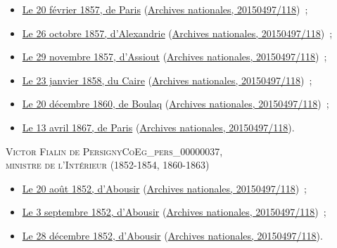 \documentclass{book}
\begin{document}
{\begin{itemize}
\item \hyperlink{CoEg_Mariette_1857-02-20}{Le 20 février 1857, de Paris} (\hyperlink{CoEg_Mariette_ms_001}{Archives nationales, 20150497/118})~;
\item \hyperlink{CoEg_Mariette_1857-10-26}{Le 26 octobre 1857, d’Alexandrie} (\hyperlink{CoEg_Mariette_ms_001}{Archives nationales, 20150497/118})~;
\item \hyperlink{CoEg_Mariette_1857-11-29}{Le 29 novembre 1857, d’Assiout} (\hyperlink{CoEg_Mariette_ms_001}{Archives nationales, 20150497/118})~;
\item \hyperlink{CoEg_Mariette_1858-01-23}{Le 23 janvier 1858, du Caire} (\hyperlink{CoEg_Mariette_ms_001}{Archives nationales, 20150497/118})~;
\item \hyperlink{CoEg_Mariette_1860-12-20}{Le 20 décembre 1860, de Boulaq} (\hyperlink{CoEg_Mariette_ms_001}{Archives nationales, 20150497/118})~;
\item \hyperlink{CoEg_Mariette_1867-04-13}{Le 13 avril 1867, de Paris} (\hyperlink{CoEg_Mariette_ms_001}{Archives nationales, 20150497/118}).
\end{itemize}

\begin{center} \textsc{Victor Fialin de Persigny\gls{CoEg_pers_00000037},\\
ministre de l'Intérieur (1852-1854, 1860-1863)}\end{center}
\begin{itemize}
\item \hyperlink{CoEg_Mariette_1852-08-20}{Le 20 août 1852, d’Abousir} (\hyperlink{CoEg_Mariette_ms_001}{Archives nationales, 20150497/118})~;
\item \hyperlink{CoEg_Mariette_1852-09-03}{Le 3 septembre 1852, d’Abousir} (\hyperlink{CoEg_Mariette_ms_001}{Archives nationales, 20150497/118})~;
\item \hyperlink{CoEg_Mariette_1852-12-28}{Le 28 décembre 1852, d’Abousir} (\hyperlink{CoEg_Mariette_ms_001}{Archives nationales, 20150497/118}).
\end{itemize}

}
\end{document}
